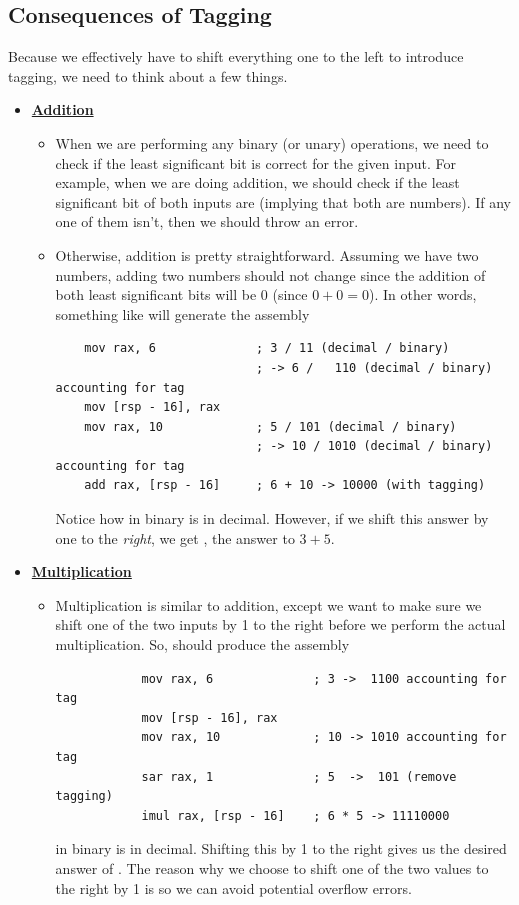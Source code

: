 \subsection{Consequences of Tagging}
Because we effectively have to shift everything one to the left to introduce tagging, we need to think about a few things.
\begin{itemize}
    \item \underline{\textbf{Addition}}
    \begin{itemize}
        \item When we are performing any binary (or unary) operations, we need to check if the least significant bit is correct for the given input. For example, when we are doing addition, we should check if the least significant bit of both inputs are  (implying that both are numbers). If any one of them isn't, then we should throw an error.
        \item Otherwise, addition is pretty straightforward. Assuming we have two numbers, adding two numbers should not change since the addition of both least significant bits will be 0 (since $0 + 0 = 0$). In other words, something like  will generate the assembly 
        \begin{verbatim}
    mov rax, 6              ; 3 / 11 (decimal / binary)  
                            ; -> 6 /   110 (decimal / binary) accounting for tag
    mov [rsp - 16], rax 
    mov rax, 10             ; 5 / 101 (decimal / binary) 
                            ; -> 10 / 1010 (decimal / binary) accounting for tag 
    add rax, [rsp - 16]     ; 6 + 10 -> 10000 (with tagging)\end{verbatim}
        Notice how  in binary is  in decimal. However, if we shift this answer by one to the \emph{right}, we get , the answer to $3 + 5$.
    \end{itemize}
    \item \underline{\textbf{Multiplication}}
    \begin{itemize}
        \item Multiplication is similar to addition, except we want to make sure we shift one of the two inputs by 1 to the right before we perform the actual multiplication. So,  should produce the assembly
        \begin{verbatim}
            mov rax, 6              ; 3 ->  1100 accounting for tag
            mov [rsp - 16], rax 
            mov rax, 10             ; 10 -> 1010 accounting for tag
            sar rax, 1              ; 5  ->  101 (remove tagging)
            imul rax, [rsp - 16]    ; 6 * 5 -> 11110000\end{verbatim}
         in binary is  in decimal. Shifting this by 1 to the right gives us the desired answer of . The reason why we choose to shift one of the two values to the right by 1 is so we can avoid potential overflow errors.
    \end{itemize}


\end{itemize}
